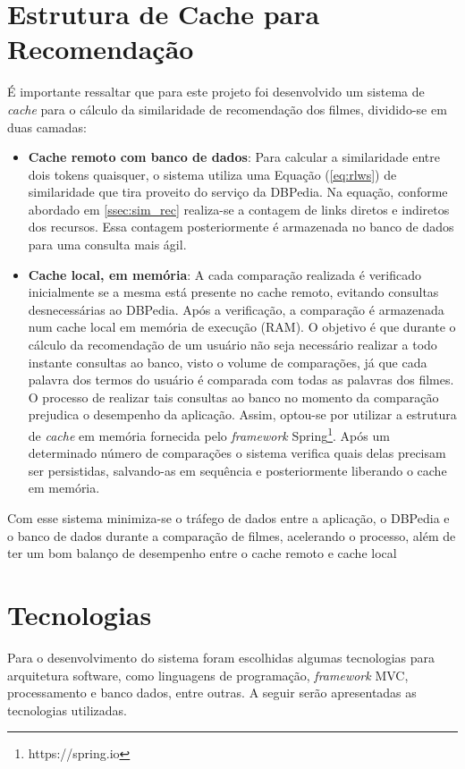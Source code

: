 \section{Estrutura de Cache para Recomendação}
\label{sec:cache}

É importante ressaltar que para este projeto foi desenvolvido um sistema de \textit{cache} para o cálculo da similaridade de recomendação dos filmes, dividido-se em duas camadas:

\begin{itemize}
	\item{\textbf{Cache remoto com banco de dados}: Para calcular a similaridade entre dois tokens quaisquer, o sistema utiliza uma Equação (\ref{eq:rlws}) de similaridade que tira proveito do serviço da DBPedia. Na equação, conforme abordado em \ref{ssec:sim_rec} realiza-se a contagem de links diretos e indiretos dos recursos. Essa contagem posteriormente é armazenada no banco de dados para uma consulta mais ágil.}
	\item{\textbf{Cache local, em memória}: A cada comparação realizada é verificado inicialmente se a mesma está presente no cache remoto, evitando consultas desnecessárias ao DBPedia. Após a verificação, a comparação é armazenada num cache local em memória de execução (\ac{RAM}). O objetivo é que durante o cálculo da recomendação de um usuário não seja necessário realizar a todo instante consultas ao banco, visto o volume de comparações, já que cada palavra dos termos do usuário é comparada com todas as palavras dos filmes. O processo de realizar tais consultas ao banco no momento da comparação prejudica o desempenho da aplicação. Assim, optou-se por utilizar a estrutura de \textit{cache} em memória fornecida pelo \textit{framework} Spring\footnote{https://spring.io}. Após um determinado número de comparações o sistema verifica quais delas precisam ser persistidas, salvando-as em sequência e posteriormente liberando o cache em memória.}
\end{itemize}

Com esse sistema minimiza-se o tráfego de dados entre a aplicação, o DBPedia e o banco de dados durante a comparação de filmes, acelerando o processo, além de ter um bom balanço de desempenho entre o cache remoto e cache local

\section{Tecnologias}

Para o desenvolvimento do sistema foram escolhidas algumas tecnologias para arquitetura software, como linguagens de programação, \textit{framework} \ac{MVC}, processamento e banco dados, entre outras. A seguir serão apresentadas as tecnologias utilizadas.

